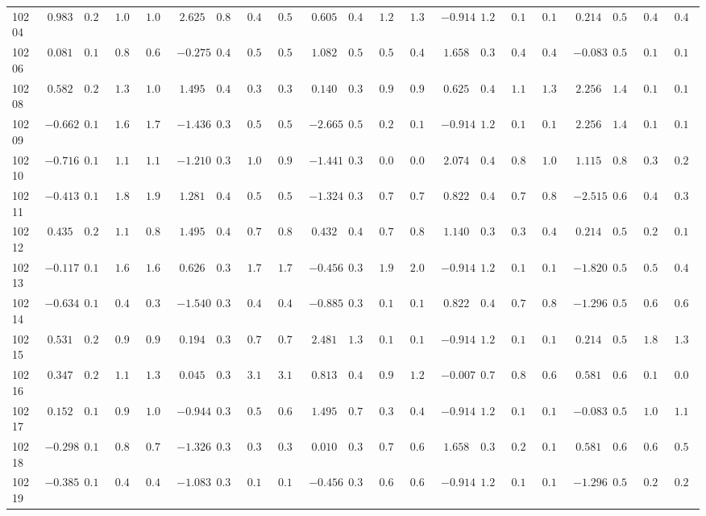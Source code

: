 \begin{landscape}
{\begin{longtable}{l|rrrr|rrrr|rrrr|rrrr|rrrr}
10204&$ 0.983$&$0.298$&$1.019$&$1.077$&$ 2.625$&$0.830$&$0.476$&$0.536$&$ 0.605$&$0.448$&$1.257$&$1.383$&$-0.914$&$1.254$&$0.135$&$0.149$&$ 0.214$&$0.594$&$0.498$&$0.462$\tabularnewline
10206&$ 0.081$&$0.188$&$0.802$&$0.674$&$-0.275$&$0.402$&$0.520$&$0.525$&$ 1.082$&$0.578$&$0.504$&$0.410$&$ 1.658$&$0.376$&$0.425$&$0.464$&$-0.083$&$0.547$&$0.104$&$0.101$\tabularnewline
10208&$ 0.582$&$0.233$&$1.369$&$1.071$&$ 1.495$&$0.495$&$0.379$&$0.346$&$ 0.140$&$0.376$&$0.917$&$0.940$&$ 0.625$&$0.488$&$1.162$&$1.350$&$ 2.256$&$1.456$&$0.164$&$0.191$\tabularnewline
10209&$-0.662$&$0.166$&$1.676$&$1.710$&$-1.436$&$0.337$&$0.586$&$0.597$&$-2.665$&$0.591$&$0.229$&$0.180$&$-0.914$&$1.254$&$0.135$&$0.149$&$ 2.256$&$1.456$&$0.164$&$0.191$\tabularnewline
10210&$-0.716$&$0.166$&$1.157$&$1.122$&$-1.210$&$0.352$&$1.032$&$0.992$&$-1.441$&$0.354$&$0.066$&$0.068$&$ 2.074$&$0.423$&$0.873$&$1.001$&$ 1.115$&$0.851$&$0.303$&$0.292$\tabularnewline
10211&$-0.413$&$0.169$&$1.845$&$1.928$&$ 1.281$&$0.457$&$0.565$&$0.578$&$-1.324$&$0.346$&$0.741$&$0.764$&$ 0.822$&$0.443$&$0.740$&$0.814$&$-2.515$&$0.681$&$0.463$&$0.364$\tabularnewline
10212&$ 0.435$&$0.216$&$1.137$&$0.867$&$ 1.495$&$0.495$&$0.770$&$0.812$&$ 0.432$&$0.415$&$0.713$&$0.827$&$ 1.140$&$0.395$&$0.373$&$0.451$&$ 0.214$&$0.594$&$0.216$&$0.194$\tabularnewline
10213&$-0.117$&$0.178$&$1.603$&$1.681$&$ 0.626$&$0.393$&$1.743$&$1.790$&$-0.456$&$0.337$&$1.967$&$2.002$&$-0.914$&$1.254$&$0.135$&$0.149$&$-1.820$&$0.555$&$0.539$&$0.451$\tabularnewline
10214&$-0.634$&$0.166$&$0.420$&$0.397$&$-1.540$&$0.332$&$0.482$&$0.499$&$-0.885$&$0.332$&$0.140$&$0.141$&$ 0.822$&$0.443$&$0.742$&$0.866$&$-1.296$&$0.509$&$0.617$&$0.639$\tabularnewline
10215&$ 0.531$&$0.227$&$0.983$&$0.952$&$ 0.194$&$0.389$&$0.780$&$0.781$&$ 2.481$&$1.316$&$0.105$&$0.119$&$-0.914$&$1.254$&$0.135$&$0.149$&$ 0.214$&$0.594$&$1.821$&$1.335$\tabularnewline
10216&$ 0.347$&$0.208$&$1.114$&$1.342$&$ 0.045$&$0.393$&$3.186$&$3.120$&$ 0.813$&$0.497$&$0.948$&$1.241$&$-0.007$&$0.714$&$0.866$&$0.660$&$ 0.581$&$0.677$&$0.154$&$0.093$\tabularnewline
10217&$ 0.152$&$0.192$&$0.965$&$1.090$&$-0.944$&$0.376$&$0.591$&$0.609$&$ 1.495$&$0.741$&$0.385$&$0.451$&$-0.914$&$1.254$&$0.135$&$0.149$&$-0.083$&$0.547$&$1.077$&$1.102$\tabularnewline
10218&$-0.298$&$0.172$&$0.812$&$0.794$&$-1.326$&$0.343$&$0.387$&$0.387$&$ 0.010$&$0.363$&$0.740$&$0.683$&$ 1.658$&$0.376$&$0.227$&$0.198$&$ 0.581$&$0.677$&$0.632$&$0.507$\tabularnewline
10219&$-0.385$&$0.170$&$0.454$&$0.427$&$-1.083$&$0.364$&$0.171$&$0.174$&$-0.456$&$0.337$&$0.676$&$0.666$&$-0.914$&$1.254$&$0.135$&$0.149$&$-1.296$&$0.509$&$0.275$&$0.263$\tabularnewline

\end{longtable}}
\end{landscape}
